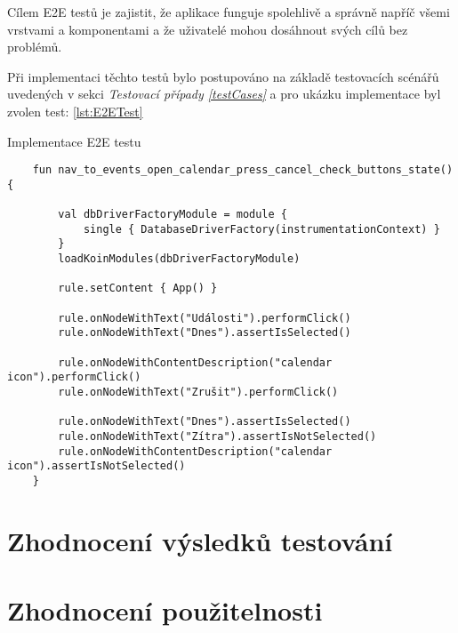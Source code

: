 Cílem E2E testů je zajistit, že aplikace funguje spolehlivě a správně napříč všemi vrstvami a komponentami a že uživatelé mohou dosáhnout 
svých cílů bez problémů.

\bigskip
Při implementaci těchto testů bylo postupováno na základě testovacích scénářů uvedených v sekci \textit{Testovací případy \ref{testCases}} a pro
ukázku implementace byl zvolen test: \ref{lst:E2ETest}

\begin{listing}[H]
  \caption{Implementace E2E testu}\label{lst:E2ETest}
  \begin{verbatim}
    fun nav_to_events_open_calendar_press_cancel_check_buttons_state() {

        val dbDriverFactoryModule = module {
            single { DatabaseDriverFactory(instrumentationContext) }
        }
        loadKoinModules(dbDriverFactoryModule)

        rule.setContent { App() }

        rule.onNodeWithText("Události").performClick()
        rule.onNodeWithText("Dnes").assertIsSelected()

        rule.onNodeWithContentDescription("calendar icon").performClick()
        rule.onNodeWithText("Zrušit").performClick()

        rule.onNodeWithText("Dnes").assertIsSelected()
        rule.onNodeWithText("Zítra").assertIsNotSelected()
        rule.onNodeWithContentDescription("calendar icon").assertIsNotSelected()
    }
\end{verbatim}
\end{listing}

\section{Zhodnocení výsledků testování}

\section{Zhodnocení použitelnosti}

